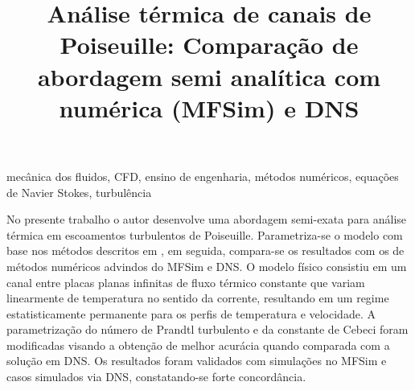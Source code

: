 \documentclass[dissertmst]{ppgco}
\title{Análise térmica de canais de Poiseuille: Comparação de abordagem semi analítica com numérica (MFSim) e DNS}
\begin{document}
\pretextual

\maketitle



\begin{resumo}{mecânica dos fluidos, CFD, ensino de engenharia, métodos numéricos, equações de Navier Stokes, turbulência}


No presente trabalho o autor desenvolve uma abordagem semi-exata para análise térmica em escoamentos turbulentos de Poiseuille. Parametriza-se o modelo com base nos métodos descritos em \cite{felipe1}, em seguida, compara-se os resultados com os de métodos numéricos advindos do MFSim e DNS. O modelo físico consistiu em um canal entre placas planas infinitas de fluxo térmico constante que variam linearmente de temperatura no sentido da corrente, resultando em um regime estatisticamente permanente para os perfis de temperatura e velocidade. A parametrização do número de Prandtl turbulento e da constante de Cebeci foram modificadas visando a obtenção de melhor acurácia quando comparada com a solução em DNS. Os resultados foram validados com simulações no MFSim e casos simulados via DNS, constatando-se forte concordância.

\end{resumo}
\end{document}
